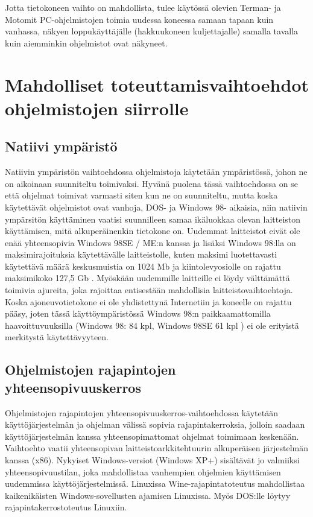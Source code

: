 \documentclass[11pt,a4paper,oneside,article]{memoir}
\begin{document}
Jotta tietokoneen vaihto on mahdollista, tulee käytössä olevien Terman- ja Motomit PC-ohjelmistojen toimia uudessa koneessa samaan tapaan kuin vanhassa, näkyen loppukäyttäjälle (hakkuukoneen kuljettajalle) samalla tavalla kuin aiemminkin ohjelmistot ovat näkyneet.

\section{Mahdolliset toteuttamisvaihtoehdot ohjelmistojen siirrolle}

\subsection{Natiivi ympäristö}

Natiivin ympäristön vaihtoehdossa ohjelmistoja käytetään ympäristössä, johon ne on aikoinaan suunniteltu toimivaksi. Hyvänä puolena tässä vaihtoehdossa on se että ohjelmat toimivat varmasti siten kun ne on suunniteltu, mutta koska käytettävät ohjelmistot ovat vanhoja, DOS- ja Windows 98- aikaisia, niin natiivin ympärsitön käyttäminen vaatisi suunnilleen samaa ikäluokkaa olevan laitteiston käyttämisen, mitä alkuperäinenkin tietokone on. Uudemmat laitteistot eivät ole enää yhteensopivia Windows 98SE / ME:n kanssa ja lisäksi Windows 98:lla on maksimirajoituksia käytettävälle laitteistolle, kuten maksimi luotettavasti käytettävä määrä keskusmuistia on 1024 Mb ja kiintolevyosiolle on rajattu maksimikoko 127,5 Gb \cite{win98:maxspecs}. Myöskään uudemmille laitteille ei löydy välttämättä toimivia ajureita, joka rajoittaa entisestään mahdollisia laitteistovaihtoehtoja. Koska ajoneuvotietokone ei ole yhdistettynä Internetiin ja koneelle on rajattu pääsy, joten tässä käyttöympäristössä Windows 98:n paikkaamattomilla haavoittuvuuksilla (Windows 98: 84 kpl, Windows 98SE 61 kpl \cite{win98:vulns}) ei ole erityistä merkitystä käytettävyyteen.

\subsection{Ohjelmistojen rajapintojen
yhteensopivuuskerros}

Ohjelmistojen rajapintojen yhteensopivuuskerros-vaihtoehdossa  käytetään käyttöjärjestelmän ja ohjelman välissä sopivia rajapintakerroksia, jolloin saadaan käyttöjärjestelmän kanssa yhteensopimattomat ohjelmat toimimaan keskenään. Vaihtoehto vaatii yhteensopivan laitteistoarkkitehtuurin alkuperäisen järjestelmän kanssa (x86). Nykyiset Windows-versiot (Windows XP+) sisältävät jo valmiiksi yhteensopivuustilan, joka mahdollistaa vanhempien ohjelmien käyttämisen uudemmissa käyttöjärjestelmissä. Linuxissa Wine-rajapintatoteutus mahdollistaa kaikenikäisten Windows-sovellusten ajamisen Linuxissa. Myös DOS:lle löytyy rajapintakerrostoteutus Linuxiin.
\end{document}

